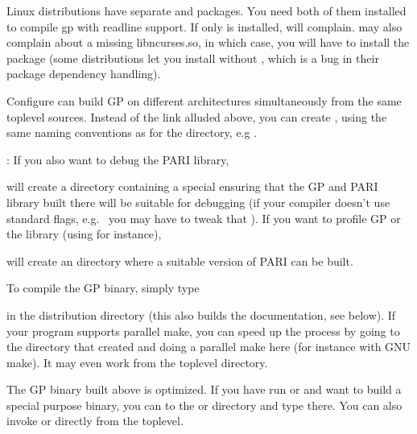  Linux distributions have separate  and
 packages. You need both of them installed to compile gp
with readline support. If only  is installed, 
will complain.  may also complain about a missing
libncurses.so, in which case, you will have to install the
 package (some distributions let you install
 without , which is a bug in their
package dependency handling).

 Configure can build GP on different architectures
simultaneously from the same toplevel sources. Instead of the 
link alluded above, you can create ,
using the same naming conventions as for the  directory,
e.g .

: If you also want to debug the PARI library,


\noindent will create a directory  containing a special
 ensuring that the GP and PARI library built there will be
suitable for debugging (if your compiler doesn't use standard flags,
e.g.~ you may have to tweak that ). If you want to
profile GP or the library (using  for instance), 


\noindent will create an  directory where a suitable version
of PARI can be built.

 To compile the GP binary, simply type


\noindent in the distribution directory (this also builds the documentation,
see below). If your  program supports parallel make, you can speed
up the process by going to the  directory that 
created and doing a parallel make here (for instance  with GNU
make). It may even work from the toplevel directory.

The GP binary built above is optimized. If you have run  or
 and want to build a special purpose binary, you can  to the
 or  directory and type  there. You can also
invoke  or  directly from the toplevel.

